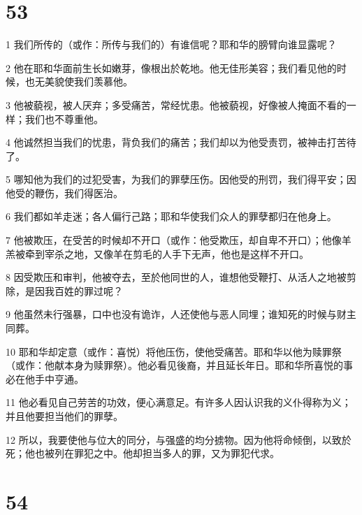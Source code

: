 \chapter{53}

\par 1 我们所传的（或作：所传与我们的）有谁信呢？耶和华的膀臂向谁显露呢？
\par 2 他在耶和华面前生长如嫩芽，像根出於乾地。他无佳形美容；我们看见他的时候，也无美貌使我们羡慕他。
\par 3 他被藐视，被人厌弃；多受痛苦，常经忧患。他被藐视，好像被人掩面不看的一样；我们也不尊重他。
\par 4 他诚然担当我们的忧患，背负我们的痛苦；我们却以为他受责罚，被神击打苦待了。
\par 5 哪知他为我们的过犯受害，为我们的罪孽压伤。因他受的刑罚，我们得平安；因他受的鞭伤，我们得医治。
\par 6 我们都如羊走迷；各人偏行己路；耶和华使我们众人的罪孽都归在他身上。
\par 7 他被欺压，在受苦的时候却不开口（或作：他受欺压，却自卑不开口）；他像羊羔被牵到宰杀之地，又像羊在剪毛的人手下无声，他也是这样不开口。
\par 8 因受欺压和审判，他被夺去，至於他同世的人，谁想他受鞭打、从活人之地被剪除，是因我百姓的罪过呢？
\par 9 他虽然未行强暴，口中也没有诡诈，人还使他与恶人同埋；谁知死的时候与财主同葬。
\par 10 耶和华却定意（或作：喜悦）将他压伤，使他受痛苦。耶和华以他为赎罪祭（或作：他献本身为赎罪祭）。他必看见後裔，并且延长年日。耶和华所喜悦的事必在他手中亨通。
\par 11 他必看见自己劳苦的功效，便心满意足。有许多人因认识我的义仆得称为义；并且他要担当他们的罪孽。
\par 12 所以，我要使他与位大的同分，与强盛的均分掳物。因为他将命倾倒，以致於死；他也被列在罪犯之中。他却担当多人的罪，又为罪犯代求。

\chapter{54}

